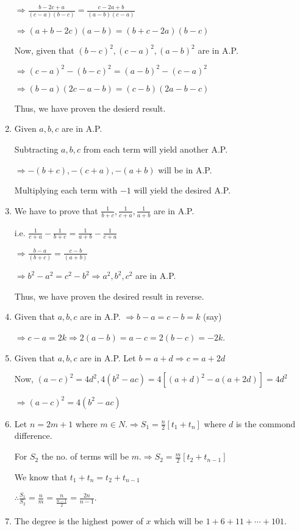 \begin{enumerate}
  $\Rightarrow \frac{b -2c + a}{(c - a)(b - c)} = \frac{c - 2a + b}{(a - b)(c - a)}$

  $\Rightarrow (a + b - 2c)(a - b) = (b + c - 2a)(b - c)$

  Now, given that $(b - c)^2, (c - a)^2, (a - b)^2$ are in A.P.

  $\Rightarrow (c - a)^2 - (b - c)^2 = (a - b)^2 - (c - a)^2$

  $\Rightarrow (b - a)(2c - a - b) = (c - b)(2a - b - c)$

  Thus, we have proven the desierd result.
\item Given $a, b, c$ are in A.P.

  Subtracting $a, b, c$ from each term will yield another A.P.

  $\Rightarrow -(b + c), -(c + a), -(a + b)$ will be in A.P.

  Multiplying each term with $-1$ will yield the desired A.P.
\item We have to prove that $\frac{1}{b + c}, \frac{1}{c + a}, \frac{1}{a + b}$ are in A.P.

  i.e. $\frac{1}{c + a} - \frac{1}{b + c} = \frac{1}{a + b} - \frac{1}{c + a}$

  $\Rightarrow \frac{b - a}{(b + c)} = \frac{c - b}{(a + b)}$

  $\Rightarrow b^2 - a^2 = c^2 - b^2 \Rightarrow a^2, b^2, c^2$ are in A.P.

  Thus, we have proven the desired result in reverse.
\item Given that $a, b, c$ are in A.P. $\Rightarrow b - a = c - b = k$ (say)

  $\Rightarrow c - a = 2k \Rightarrow 2(a - b) = a - c = 2(b - c) = -2k$.
\item Given that $a, b, c$ are in A.P. Let $b = a + d \Rightarrow c = a + 2d$

  Now, $(a - c)^2 = 4d^2, 4(b^2 - ac) = 4[(a + d)^2 - a(a + 2d)] = 4d^2$

  $\Rightarrow (a - c)^2 = 4(b^2 - ac)$
\item Let $n = 2m + 1$ where $m\in N. \Rightarrow S_1 = \frac{n}{2}[t_1 + t_n]$ where $d$ is the commond difference.

  For $S_2$ the no. of terms will be $m. \Rightarrow S_2 = \frac{m}{2}[t_2 + t_{n - 1}]$

  We know that $t_1 + t_n = t_2 + t_{n - 1}$

  $\therefore \frac{S_1}{S_2} = \frac{n}{m} = \frac{n}{\tfrac{n - 1}{2}} = \frac{2n}{n - 1}$.
\item The degree is the highest power of $x$ which will be $1 + 6 + 11 + \cdots + 101$.


\end{enumerate}
